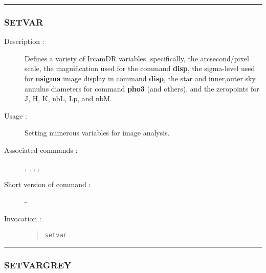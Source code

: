 \hrule
\subsubsection*{\label{SETVAR}SETVAR}

\begin{description}

\item[Description :] Defines a variety of {\sc IrcamDR} variables,
specifically, the arcsecond/pixel scale, the magnification used for the
command {\bf disp}, the sigma-level used for {\bf nsigma} image display
in command {\bf disp}, the star and inner,outer sky annulus diameters
for command {\bf pho3} (and others), and the zeropoints for J, H, K,
nbL, Lp, and nbM.

\item[Usage :] Setting numerous variables for image analysis.

\item[Associated commands :] {\tt {}},
{\tt {}}, {\tt {}},
{\tt {}}, {\tt {}}

\item[Short version of command :] -
\item[Invocation :]

\begin{quote}{\tt  setvar }\end{quote}

\end{description}

\hrule
\subsubsection*{\label{SETVARGREY}SETVARGREY}


